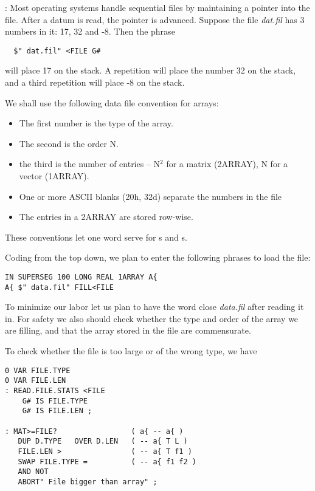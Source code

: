 \leftbar[1\linewidth]
\Note: Most operating systems handle sequential files by maintaining a pointer into the file.
After a datum is read, the pointer is advanced.
Suppose the file \textit{dat.fil} has 3 numbers in it: 17, 32 and -8.
Then the phrase
\endleftbar

\begin{lstlisting}
  $" dat.fil" <FILE G#
\end{lstlisting}

will place 17 on the stack.
A repetition will place the number 32 on the stack, and a third repetition will place -8 on the stack.

We shall use the following data file convention for arrays:
\begin{itemize}
\item The first number is the type of the array.
\item The second is the order N.
\item the third is the number of entries -- N$^2$ for a matrix (2ARRAY), N for a vector (1ARRAY).
\item One or more ASCII blanks (20h, 32d) separate the numbers in the file
\item The entries in a 2ARRAY are stored row-wise.
\end{itemize}

These conventions let one word serve for s and s.

Coding from the top down, we plan to enter the following phrases to load the file:

\begin{lstlisting}
IN SUPERSEG 100 LONG REAL 1ARRAY A{
A{ $" data.fil" FILL<FILE
\end{lstlisting}

To minimize our labor let us plan to have the word  close \textit{data.fil} after reading it in.
For safety we also should check whether the type and order of the array we are filling, and that the array stored in the file are commensurate.

To check whether the file is too large or of the wrong type, we have

\begin{lstlisting}
0 VAR FILE.TYPE
0 VAR FILE.LEN
: READ.FILE.STATS <FILE
    G# IS FILE.TYPE
    G# IS FILE.LEN ;

: MAT>=FILE?                 ( a{ -- a{ )
   DUP D.TYPE   OVER D.LEN   ( -- a{ T L )
   FILE.LEN >                ( -- a{ T f1 )
   SWAP FILE.TYPE =          ( -- a{ f1 f2 )
   AND NOT
   ABORT" File bigger than array" ;
\end{lstlisting}

